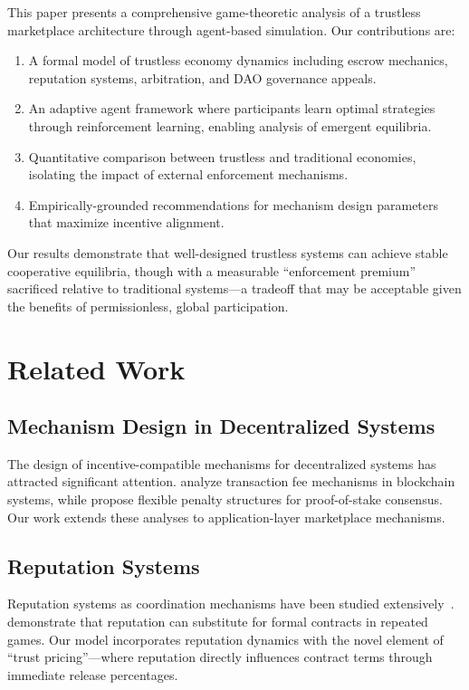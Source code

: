 \documentclass[11pt,a4paper]{article}
\begin{document}
This paper presents a comprehensive game-theoretic analysis of a trustless marketplace architecture through agent-based simulation. Our contributions are:

\begin{enumerate}
    \item A formal model of trustless economy dynamics including escrow mechanics, reputation systems, arbitration, and DAO governance appeals.
    \item An adaptive agent framework where participants learn optimal strategies through reinforcement learning, enabling analysis of emergent equilibria.
    \item Quantitative comparison between trustless and traditional economies, isolating the impact of external enforcement mechanisms.
    \item Empirically-grounded recommendations for mechanism design parameters that maximize incentive alignment.
\end{enumerate}

Our results demonstrate that well-designed trustless systems can achieve stable cooperative equilibria, though with a measurable ``enforcement premium'' sacrificed relative to traditional systems---a tradeoff that may be acceptable given the benefits of permissionless, global participation.

\section{Related Work}

\subsection{Mechanism Design in Decentralized Systems}

The design of incentive-compatible mechanisms for decentralized systems has attracted significant attention. \citet{roughgarden2020transaction} analyze transaction fee mechanisms in blockchain systems, while \citet{buterin2019flexible} propose flexible penalty structures for proof-of-stake consensus. Our work extends these analyses to application-layer marketplace mechanisms.

\subsection{Reputation Systems}

Reputation systems as coordination mechanisms have been studied extensively~\citep{resnick2000reputation, dellarocas2003digitization}. \citet{bolton2004competition} demonstrate that reputation can substitute for formal contracts in repeated games. Our model incorporates reputation dynamics with the novel element of ``trust pricing''---where reputation directly influences contract terms through immediate release percentages.
\end{document}
